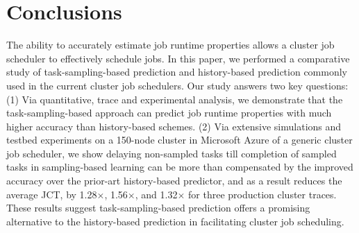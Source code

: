 \section{Conclusions}
\label{sec:conc}

The ability to accurately estimate job runtime properties allows a cluster job
scheduler to effectively schedule jobs.  In this paper, we performed a
comparative study of task-sampling-based prediction and history-based
prediction commonly used in the current cluster job schedulers. Our study
answers two key questions: (1) Via quantitative, trace and experimental
analysis, we demonstrate that the task-sampling-based approach can predict job
runtime properties with much higher accuracy than history-based schemes.  (2)
Via extensive simulations and testbed experiments on a 150-node cluster in
Microsoft Azure of a generic cluster job scheduler, we show delaying
non-sampled tasks till completion of sampled tasks in sampling-based learning
can be more than compensated by the improved accuracy over the prior-art
history-based predictor, and as a result reduces the average JCT, by
1.28$\times$,
1.56$\times$, and 1.32$\times$ 
for three production cluster traces.
These results suggest task-sampling-based prediction offers a 
promising alternative to the history-based prediction in facilitating cluster
job scheduling. 

